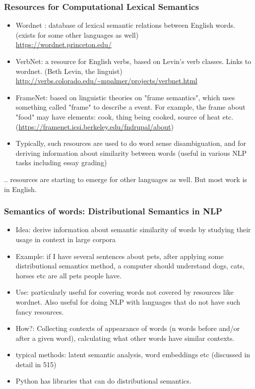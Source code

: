 \documentclass{beamer}
\begin{document}
\begin{frame}
\frametitle{Resources for Computational Lexical Semantics}
\begin{itemize} \small
\item Wordnet : database of lexical semantic relations between English words. (exists for some other languages as well) \\ \url{https://wordnet.princeton.edu/}
\item VerbNet: a resource for English verbs, based on Levin's verb classes. Links to wordnet. (Beth Levin, the linguist) \\ \url{http://verbs.colorado.edu/~mpalmer/projects/verbnet.html}
\item FrameNet: based on linguistic theories on "frame semantics", which uses something called "frame" to describe a event. For example, the frame about "food" may have elements: cook, thing being cooked, source of heat etc. \\ (\url{https://framenet.icsi.berkeley.edu/fndrupal/about})
\item Typically, such resources are used to do word sense disambiguation, and for deriving information about similarity between words (useful in various NLP tasks including essay grading) 
\end{itemize}
.. resources are starting to emerge for other languages as well. But most work is in English. 
\end{frame}

\begin{frame}
\frametitle{Semantics of words: Distributional Semantics in NLP}
\begin{itemize}
\item Idea: derive information about semantic similarity of words by studying their usage in context in large corpora
\item Example: if I have several sentences about pets, after applying some distributional semantics method, a computer should understand dogs, cats, horses etc are all pets people have. 
\item Use: particularly useful for covering words not covered by resources like wordnet. Also useful for doing NLP with languages that do not have such fancy resources.
\item How?: Collecting contexts of appearance of words (n words before and/or after a given word), calculating what other words have similar contexts. 
\item typical methods: latent semantic analysis, word embeddings etc (discussed in detail in 515)
\item Python has libraries that can do distributional semantics.
\end{itemize}
\end{frame}
\end{document}
